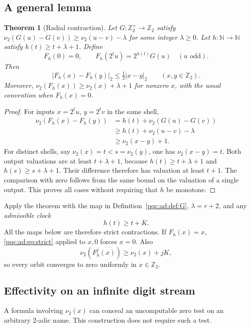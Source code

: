 \documentclass[11pt,letterpaper]{article}
\numberwithin{equation}{section}
\newtheorem{theorem}{Theorem}[section]
\theoremstyle{definition}
\theoremstyle{remark}
\newcommand{\N}{\mathbb N}
\newcommand{\Ztwo}{\mathbb Z_2}
\newcommand{\nuu}{\nu_2}
\begin{document}
\subsection{A general lemma}
\begin{theorem}[Radial contraction]\label{pqc:ad:thm:radial}
Let $G\colon\Ztwo^\times\to\Ztwo$ satisfy
$\nuu(G(u)-G(v))\ge\nuu(u-v)-\lambda$ for some integer $\lambda\ge0$.
Let $h\colon\N\to\N$ satisfy $h(t)\ge t+\lambda+1$. Define
\begin{equation}\label{pqc:ad:eq:F}
F_h(0)=0,\qquad
F_h(2^t u)=2^{h(t)}G(u)\quad(u\text{ odd}).
\end{equation}
Then
\begin{equation}\label{pqc:ad:eq:strict}
|F_h(x)-F_h(y)|_2\le\tfrac12|x-y|_2
\qquad(x,y\in\Ztwo).
\end{equation}
Moreover, $\nuu(F_h(x))\ge\nuu(x)+\lambda+1$ for nonzero $x$, with the
usual convention when $F_h(x)=0$.
\end{theorem}
\begin{proof}
For inputs $x=2^tu$, $y=2^tv$ in the same shell,
\begin{align*}
\nuu(F_h(x)-F_h(y))
&=h(t)+\nuu(G(u)-G(v))\\
&\ge h(t)+\nuu(u-v)-\lambda\\
&\ge\nuu(x-y)+1.
\end{align*}
For distinct shells, say $\nuu(x)=t<s=\nuu(y)$, one has
$\nuu(x-y)=t$. Both output valuations are at least $t+\lambda+1$,
because $h(t)\ge t+\lambda+1$ and $h(s)\ge s+\lambda+1$.
Their difference therefore has valuation at least $t+1$. The comparison
with zero follows from the same bound on the valuation of a single output.
This proves all cases without requiring that $h$ be monotone.
\end{proof}

Apply the theorem with the map in Definition~\ref{pqc:ad:def:G},
$\lambda=r+2$, and any \emph{admissible clock}
\begin{equation}\label{pqc:ad:eq:admissible}
h(t)\ge t+K.
\end{equation}
All the maps below are therefore strict contractions. If $F_h(x)=x$,
\eqref{pqc:ad:eq:strict} applied to $x,0$ forces $x=0$. Also
\begin{equation}\label{pqc:ad:eq:globaldrift}
\nuu(F_h^j(x))\ge\nuu(x)+jK,
\end{equation}
so every orbit converges to zero uniformly in $x\in\Ztwo$.

\subsection{Effectivity on an infinite digit stream}
A formula involving $\nuu(x)$ can conceal an uncomputable zero test on an
arbitrary $2$-adic name. This construction does not require such a test.
\end{document}
